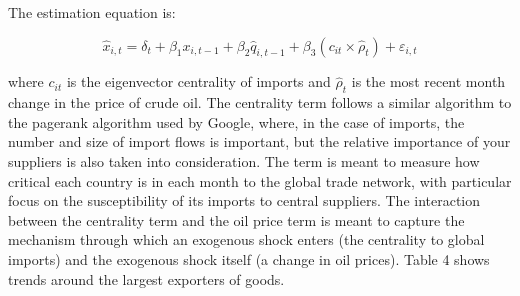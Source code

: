 \documentclass[10pt,letterpaper]{article}
\begin{document}
The estimation equation is:

$$ \hat{x}_{i,t} = \delta_{t} + \beta_1 x_{i,t-1} + \beta_2 \hat{q}_{i,t-1} + \beta_3 (c_{it} \times \hat{\rho}_{t}) + \varepsilon_{i,t} $$

where $c_{it}$ is the eigenvector centrality of imports and $\hat{\rho}_{t}$ is the most recent month change in the price of crude oil. The centrality term follows a similar algorithm to the pagerank algorithm used by Google, where, in the case of imports, the number and size of import flows is important, but the relative importance of your suppliers is also taken into consideration. The term is meant to measure how critical each country is in each month to the global trade network, with particular focus on the susceptibility of its imports to central suppliers. The interaction between the centrality term and the oil price term is meant to capture the mechanism through which an exogenous shock enters (the centrality to global imports) and the exogenous shock itself (a change in oil prices). Table 4 shows trends around the largest exporters of goods. 
\end{document}
